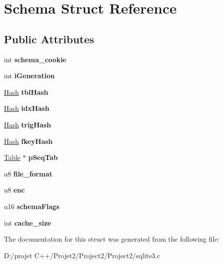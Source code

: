 \hypertarget{struct_schema}{}\section{Schema Struct Reference}
\label{struct_schema}
\subsection*{Public Attributes}
\begin{DoxyCompactItemize}
\item 
\mbox{\label{struct_schema_a3eef54a64f4f962d64577646bd34a47c}} 
int {\bfseries schema\+\_\+cookie}
\item 
\mbox{\label{struct_schema_a879b1597656c7cbcbb98cdb88e876874}} 
int {\bfseries i\+Generation}
\item 
\mbox{\label{struct_schema_af841eadc93b289944b95f72b784bfaae}} 
\mbox{\hyperlink{struct_hash}{Hash}} {\bfseries tbl\+Hash}
\item 
\mbox{\label{struct_schema_ac0dd242f486d17ddadca1e47af76c6c5}} 
\mbox{\hyperlink{struct_hash}{Hash}} {\bfseries idx\+Hash}
\item 
\mbox{\label{struct_schema_ab521f4545d200329d8e1a46bbb67e7c5}} 
\mbox{\hyperlink{struct_hash}{Hash}} {\bfseries trig\+Hash}
\item 
\mbox{\label{struct_schema_ad51ed96351701cfe8d9e871722827c11}} 
\mbox{\hyperlink{struct_hash}{Hash}} {\bfseries fkey\+Hash}
\item 
\mbox{\label{struct_schema_ad580e4e662724bee95571d297f94da37}} 
\mbox{\hyperlink{struct_table}{Table}} $\ast$ {\bfseries p\+Seq\+Tab}
\item 
\mbox{\label{struct_schema_ab9f0371436e41b3080772995407a4cca}} 
u8 {\bfseries file\+\_\+format}
\item 
\mbox{\label{struct_schema_a1338d09fe9cbb5a8162929202cb73cae}} 
u8 {\bfseries enc}
\item 
\mbox{\label{struct_schema_a19310cba7982138909683b1801258c18}} 
u16 {\bfseries schema\+Flags}
\item 
\mbox{\label{struct_schema_a0a66691be95a30c099ca4840da7110dd}} 
int {\bfseries cache\+\_\+size}
\end{DoxyCompactItemize}


The documentation for this struct was generated from the following file\+:\begin{DoxyCompactItemize}
\item 
D\+:/projet C++/\+Projet2/\+Project2/\+Project2/sqlite3.\+c\end{DoxyCompactItemize}
